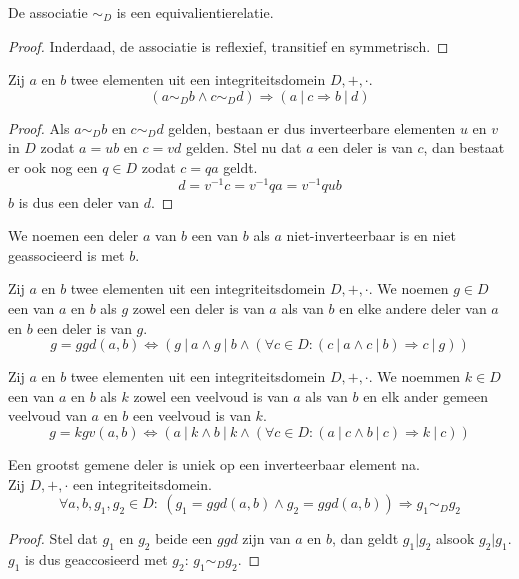 \documentclass[main.tex]{subfiles}
\begin{document}
\begin{ei}
  \label{ei:associatie-is-equivalentierelatie}
  De associatie $\sim_{D}$ is een equivalientierelatie.
  \begin{proof}
    Inderdaad, de associatie is reflexief, transitief en symmetrisch.
  \end{proof}
\end{ei}

\begin{st}
  Zij $a$ en $b$ twee elementen uit een integriteitsdomein $D,+,\cdot$.
  \[ (a \sim_{D} b \wedge c \sim_{D} d) \Rightarrow (a\ |\ c \Rightarrow b\ |\ d) \]

  \begin{proof}
    Als $a\sim_{D} b$ en $c\sim_{D} d$ gelden, bestaan er dus inverteerbare elementen $u$ en $v$ in $D$ zodat $a=ub$ en $c=vd$ gelden.
    Stel nu dat $a$ een deler is van $c$, dan bestaat er ook nog een $q\in D$ zodat $c=qa$ geldt.
    \[ d = v^{-1}c = v^{-1}qa = v^{-1}qub \]
    $b$ is dus een deler van $d$.
  \end{proof}
\end{st}

\begin{de}
  We noemen een deler $a$ van $b$ een  van $b$ als $a$ niet-inverteerbaar is en niet geassocieerd is met $b$.
\end{de}

\begin{de}
  \label{de:ggd}
  Zij $a$ en $b$ twee elementen uit een integriteitsdomein $D,+,\cdot$.
  We noemen $g\in D$ een  van $a$ en $b$ als $g$ zowel een deler is van $a$ als van $b$ en elke andere deler van $a$ en $b$ een deler is van $g$.
  \[ g = ggd(a,b) \Leftrightarrow (g\ |\ a \wedge g\ |\ b \wedge (\forall c\in D: (c\ |\ a \wedge c\ |\ b) \Rightarrow c\ |\ g)) \]
\end{de}

\begin{de}
  \label{de:kgv}
  Zij $a$ en $b$ twee elementen uit een integriteitsdomein $D,+,\cdot$.
  We noemmen $k\in D$ een  van $a$ en $b$ als $k$ zowel een veelvoud is van $a$ als van $b$ en elk ander gemeen veelvoud van $a$ en $b$ een veelvoud is van $k$.
  \[ g = kgv(a,b) \Leftrightarrow (a\ |\ k \wedge b\ |\ k \wedge (\forall c\in D: (a\ |\ c \wedge b\ |\ c) \Rightarrow k\ |\ c)) \]
\end{de}

\begin{st}
  \label{st:ggd-uniek}
  Een grootst gemene deler is uniek op een inverteerbaar element na.\\
  Zij $D,+,\cdot$ een integriteitsdomein.
  \[ \forall a,b,g_{1},g_{2} \in D:\ (g_{1} = ggd(a,b) \wedge g_{2} = ggd(a,b)) \Rightarrow g_{1} \sim_{D} g_{2} \]
  \begin{proof}
    Stel dat $g_{1}$ en $g_{2}$ beide een $ggd$ zijn van $a$ en $b$, dan geldt $g_{1}|g_{2}$ alsook $g_{2}|g_{1}$.
    $g_{1}$ is dus geaccosieerd met $g_{2}$: $g_{1} \sim_{D} g_{2}$.
  \end{proof}
\end{st}
\end{document}
